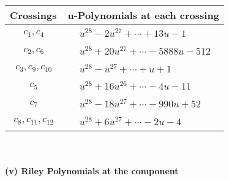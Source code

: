 \documentclass[1p]{elsarticle_modified}
\theoremstyle{definition}
\begin{document}
\begin{tabular}{m{50pt}|m{274pt}}
Crossings & \hspace{64pt}u-Polynomials at each crossing \\
\hline $$\begin{aligned}c_{1},c_{4}\end{aligned}$$&$\begin{aligned}
&u^{28}-2 u^{27}+\cdots+13 u-1
\end{aligned}$\\
\hline $$\begin{aligned}c_{2},c_{6}\end{aligned}$$&$\begin{aligned}
&u^{28}+20 u^{27}+\cdots-5888 u-512
\end{aligned}$\\
\hline $$\begin{aligned}c_{3},c_{9},c_{10}\end{aligned}$$&$\begin{aligned}
&u^{28}- u^{27}+\cdots+u+1
\end{aligned}$\\
\hline $$\begin{aligned}c_{5}\end{aligned}$$&$\begin{aligned}
&u^{28}+16 u^{26}+\cdots-4 u-11
\end{aligned}$\\
\hline $$\begin{aligned}c_{7}\end{aligned}$$&$\begin{aligned}
&u^{28}-18 u^{27}+\cdots-990 u+52
\end{aligned}$\\
\hline $$\begin{aligned}c_{8},c_{11},c_{12}\end{aligned}$$&$\begin{aligned}
&u^{28}+6 u^{27}+\cdots-2 u-4
\end{aligned}$\\
\hline
\end{tabular}\\~\\
\newpage\renewcommand{\arraystretch}{1}
\flushleft \textbf{(v) Riley Polynomials at the component}\newline \\
\end{document}
